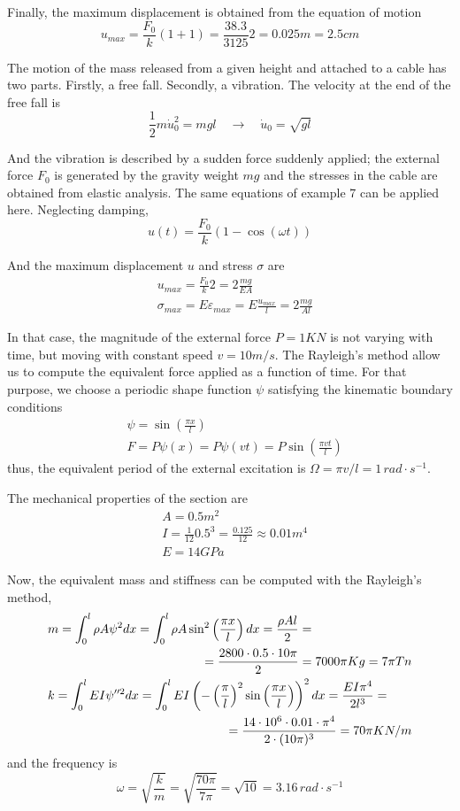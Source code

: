 \documentclass{problems}
\begin{document}
Finally, the maximum displacement is obtained from the equation of motion
$$
u_{max} = \frac{F_0}{k}(1+1) = \frac{38.3}{3125}2 = 0.025m = 2.5cm
$$



The motion of the mass released from a given height and attached to a cable has two parts. Firstly, a free fall. Secondly, a vibration. The velocity at the end of the free fall is
$$
\frac{1}{2}m\dot{u}_0^2 = mgl \quad \rightarrow \quad \dot{u}_0 = \sqrt{gl}
$$

And the vibration is described by a sudden force suddenly applied; the external force $F_0$ is generated by the gravity weight $mg$ and the stresses in the cable are obtained from elastic analysis. The same equations of example 7 can be applied here. Neglecting damping,
$$
u(t) = \frac{F_0}{k}(1 -\cos(\omega t))
$$

And the maximum displacement $u$ and stress $\sigma$ are
\begin{align*}
&u_{max} = \frac{F_0}{k}2 = 2\frac{mg}{EA} \\
&\sigma_{max} = E\varepsilon_{max} = E\frac{u_{max}}{l} = 2\frac{mg}{Al}
\end{align*}



In that case, the magnitude of the external force $P=1KN$ is not varying with time, but moving with constant speed $v=10m/s$. The Rayleigh's method allow us to compute the equivalent force applied as a function of time. For that purpose, we choose a periodic shape function $\psi$ satisfying the kinematic boundary conditions
\begin{align*}
&\psi = \sin\left(\frac{\pi x}{l}\right) \\
&F = P\psi(x) = P\psi(vt) = P\sin\left(\frac{\pi vt}{l}\right)
\end{align*}
thus, the equivalent period of the external excitation is $\Omega = \pi v/l = 1\,rad\cdot s^{-1}$.

The mechanical properties of the section are
\begin{align*}
&A = 0.5m^2 \\
&I = \frac{1}{12}0.5^3 = \frac{0.125}{12} \approx 0.01 m^4\\
&E = 14GPa
\end{align*}

Now, the equivalent mass and stiffness can be computed with the Rayleigh's method,
\begin{align*}
&m = \int_0^l \rho A\psi^2dx = \int_0^l \rho A\sin^2\left(\frac{\pi x}{l}\right)dx = \frac{\rho Al}{2} = \\
& \pushright{= \frac{2800 \cdot 0.5 \cdot 10\pi}{2} = 7000\pi Kg = 7\pi Tn} \\
&k = \int_0^l EI\psi''^2dx = \int_0^l EI\left(-\left(\frac{\pi}{l}\right)^2\sin\left(\frac{\pi x}{l}\right)\right)^2dx = \frac{EI\pi^4}{2l^3} = \qquad \\
& \pushright{= \frac{14\cdot 10^6 \cdot 0.01 \cdot \pi^4}{2 \cdot (10\pi)^3} =
70\pi KN/m}
\end{align*}
and the frequency is
$$
\omega = \sqrt{\frac{k}{m}} = \sqrt{\frac{70\pi}{7\pi}} = \sqrt{10} = 3.16\,rad\cdot s^{-1}
$$
\end{document}
